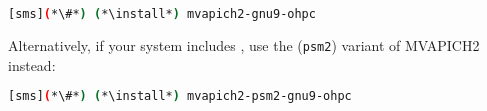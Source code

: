 \begin{lstlisting}[language=bash]
[sms](*\#*) (*\install*) mvapich2-gnu9-ohpc
\end{lstlisting}

Alternatively, if your system includes \IntelR{} \OmniPath{}, use the (\texttt{psm2})
variant of MVAPICH2 instead:

\begin{lstlisting}[language=bash]
[sms](*\#*) (*\install*) mvapich2-psm2-gnu9-ohpc
\end{lstlisting}

